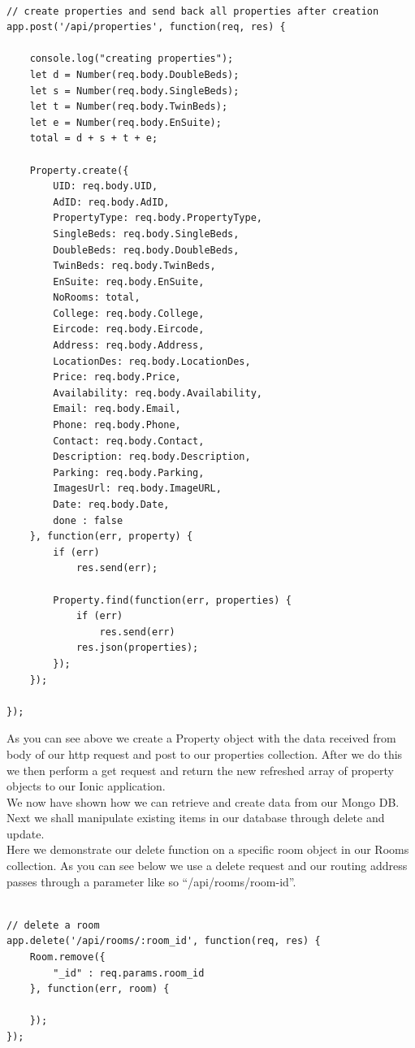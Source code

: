 \begin{verbatim}

// create properties and send back all properties after creation
app.post('/api/properties', function(req, res) {

	console.log("creating properties");
	let d = Number(req.body.DoubleBeds);
	let s = Number(req.body.SingleBeds);
	let t = Number(req.body.TwinBeds);
	let e = Number(req.body.EnSuite);
	total = d + s + t + e;

	Property.create({
		UID: req.body.UID,
		AdID: req.body.AdID,
		PropertyType: req.body.PropertyType,
		SingleBeds: req.body.SingleBeds,
		DoubleBeds: req.body.DoubleBeds,
		TwinBeds: req.body.TwinBeds,
		EnSuite: req.body.EnSuite,
		NoRooms: total,
		College: req.body.College,
		Eircode: req.body.Eircode,
		Address: req.body.Address,
		LocationDes: req.body.LocationDes,
		Price: req.body.Price,
		Availability: req.body.Availability,
		Email: req.body.Email,
		Phone: req.body.Phone,
		Contact: req.body.Contact,
		Description: req.body.Description,
		Parking: req.body.Parking,
		ImagesUrl: req.body.ImageURL,
		Date: req.body.Date,
		done : false
	}, function(err, property) {
		if (err)
			res.send(err);

		Property.find(function(err, properties) {
			if (err)
				res.send(err)
			res.json(properties);
		});
	});

});

\end{verbatim}

As you can see above we create a Property object with the data received from body of our http request and post to our properties collection. After we do this we then perform a get request and return the new refreshed array of property objects to our Ionic application.\\


We now have shown how we can retrieve and create data from our Mongo DB. Next we shall manipulate existing items in our database through delete and update.\\


Here we demonstrate our delete function on a specific room object in our Rooms collection. As you can see below we use a delete request and our routing address passes through a parameter like so “/api/rooms/room-id”.\\


\begin{verbatim}

// delete a room
app.delete('/api/rooms/:room_id', function(req, res) {
	Room.remove({
		"_id" : req.params.room_id
	}, function(err, room) {

	});
});

\end{verbatim}


